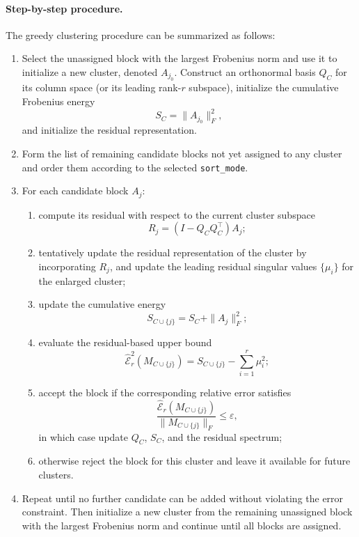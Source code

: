 \documentclass[10pt]{article} %
\begin{document}
\paragraph{Step-by-step procedure.}
The greedy clustering procedure can be summarized as follows:
\begin{enumerate}
  \item Select the unassigned block with the largest Frobenius norm and use it
  to initialize a new cluster, denoted $A_{j_0}$. Construct an orthonormal
  basis $Q_C$ for its column space (or its leading rank-$r$ subspace),
  initialize the cumulative Frobenius energy
  \[
    S_C = \|A_{j_0}\|_F^2,
  \]
  and initialize the residual representation.

  \item Form the list of remaining candidate blocks not yet assigned to any
  cluster and order them according to the selected \texttt{sort\_mode}.

  \item For each candidate block $A_j$:
  \begin{enumerate}
    \item compute its residual with respect to the current cluster subspace
    \[
      R_j = (I - Q_C Q_C^\top)A_j;
    \]

    \item tentatively update the residual representation of the cluster by
    incorporating $R_j$, and update the leading residual singular values
    $\{\mu_i\}$ for the enlarged cluster;

    \item update the cumulative energy
    \[
      S_{C\cup\{j\}} = S_C + \|A_j\|_F^2;
    \]

    \item evaluate the residual-based upper bound
    \[
      \widehat{\mathcal{E}}_r^2(M_{C\cup\{j\}})
      =
      S_{C\cup\{j\}} - \sum_{i=1}^r \mu_i^2;
    \]

    \item accept the block if the corresponding relative error satisfies
    \[
      \frac{\widehat{\mathcal{E}}_r(M_{C\cup\{j\}})}
           {\|M_{C\cup\{j\}}\|_F}
      \le \varepsilon,
    \]
    in which case update $Q_C$, $S_C$, and the residual spectrum;

    \item otherwise reject the block for this cluster and leave it available
    for future clusters.
  \end{enumerate}

  \item Repeat until no further candidate can be added without violating the
  error constraint. Then initialize a new cluster from the remaining
  unassigned block with the largest Frobenius norm and continue until all
  blocks are assigned.
\end{enumerate}
\end{document}
